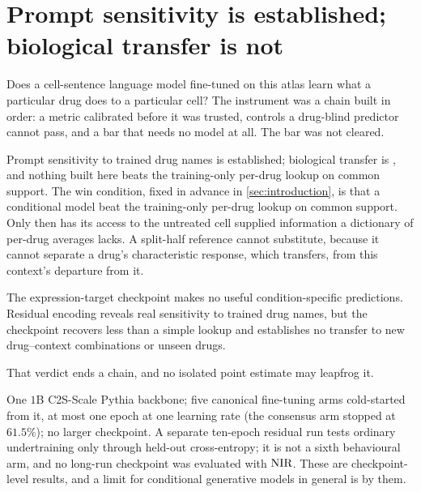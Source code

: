 
\chapter{Prompt sensitivity is established; biological transfer is not}
\label{sec:conclusions}


\begin{question}
Does a cell-sentence language model fine-tuned on this atlas learn what a
particular drug does to a particular cell? The instrument was a chain built
in order: a metric calibrated before it was trusted, controls a drug-blind
predictor cannot pass, and a bar that needs no model at all. The bar was not
cleared.
\end{question}

Prompt sensitivity to trained drug names is established; biological
transfer is \notestablished, and nothing built here beats the training-only
per-drug lookup on common support.
\noindent
The win condition, fixed in advance in \cref{sec:introduction}, is that a
conditional model beat the training-only per-drug lookup on common support. Only
then has its access to the untreated cell supplied information a dictionary of
per-drug averages lacks. A split-half reference cannot substitute, because it
cannot separate a drug's characteristic response, which transfers, from this
context's departure from it.

The expression-target checkpoint makes no useful condition-specific predictions.
Residual encoding reveals real sensitivity to trained drug names, but the
checkpoint recovers less than a simple lookup and establishes no transfer to new
drug--context combinations or unseen drugs.

That verdict ends a chain, and no isolated point estimate may leapfrog it.

\begin{scopelimit}
One $1$B C2S-Scale Pythia backbone; five canonical fine-tuning arms cold-started
from it, at most one epoch at one learning rate (the consensus arm stopped at
$61.5\%$); no larger checkpoint. A separate ten-epoch residual run tests ordinary
undertraining only through held-out cross-entropy; it is not a sixth behavioural
arm, and no long-run checkpoint was evaluated with $\textrm{NIR}$. These are
checkpoint-level results, and a limit for conditional generative models in
general is \notestablished by them.
\end{scopelimit}

